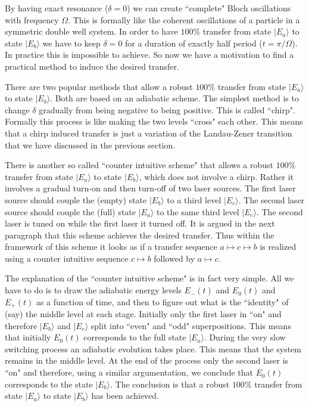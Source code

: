 \documentclass[onecolumn,fleqn]{revtex4}
\begin{document}
By having exact resonance ($\delta=0$) we can 
create ``complete" Bloch oscillations with 
frequency $\Omega$. This is formally like the 
coherent oscillations of a particle 
in a symmetric double well system. 
In order to have $100\%$ transfer from 
state $|E_a\rangle$ to state $|E_b\rangle$ 
we have to keep $\delta=0$ for a duration 
of exactly half period (${t=\pi/\Omega}$). 
In practice this is impossible to achieve.
So now we have a motivation to find 
a practical method to induce the desired 
transfer. 



There are two popular methods  
that allow a robust $100\%$ transfer from 
state $|E_a\rangle$ to state $|E_b\rangle$. 
Both are based on an adiabatic scheme.
The simplest method is to change $\delta$ gradually  
from being negative to being positive. 
This is called ``chirp". Formally this 
process is like making the two levels ``cross" 
each other. This means that a chirp induced transfer 
is just a variation of the Landau-Zener 
transition that we have discussed in the previous section.


There is another so called ``counter intuitive scheme" 
that allows a robust $100\%$ transfer from 
state $|E_a\rangle$ to state $|E_b\rangle$, 
which does not involve a chirp. 
Rather it involves a gradual turn-on 
and then turn-off of two laser sources. 
The first laser source should couple 
the (empty) state $|E_b\rangle$ to a  
third level $|E_c\rangle$. 
The second  laser source should couple 
the (full) state $|E_a\rangle$ to  
the same third level $|E_c\rangle$. 
The second laser is tuned on while 
the first laser it turned off. 
It is argued in the next paragraph that 
this scheme achieves the desired transfer. 
Thus within the framework of this scheme 
it looks as if a transfer 
sequence ${a\mapsto c\mapsto b}$ 
is realized using a counter intuitive 
sequence ${c\mapsto b}$ followed by ${a\mapsto c}$. 



The explanation of the ``counter intuitive scheme"  
is in fact very simple. All we have to do is to 
draw the adiabatic energy levels $E_{-}(t)$ 
and $E_0(t)$ and $E_{+}(t)$ as a function of time, 
and then to figure out what is the ``identity" 
of (say) the middle level at each stage. 
Initially only the first laser in ``on" 
and therefore $|E_b\rangle$ and $|E_c\rangle$ 
split into ``even" and ``odd" superpositions. 
This means that initially $E_0(t)$ corresponds  
to the full state $|E_a\rangle$. 
During the very slow switching process 
an adiabatic evolution takes place.  
This means that the system remains in the middle 
level. At the end of the process only the second 
laser is ``on" and therefore, using a similar 
argumentation, we conclude that $E_0(t)$ corresponds  
to the state $|E_b\rangle$. The conclusion is 
that a robust $100\%$ transfer from 
state $|E_a\rangle$ to state $|E_b\rangle$ 
has been achieved.
  
\end{document}
